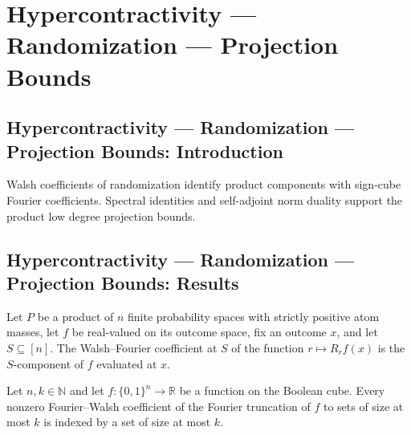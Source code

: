 \section{Hypercontractivity --- Randomization --- Projection Bounds}
\subsection*{Hypercontractivity --- Randomization --- Projection Bounds: Introduction}
Walsh coefficients of randomization identify product components with sign-cube Fourier coefficients. Spectral identities and self-adjoint norm duality support the product low degree projection bounds.

\subsection*{Hypercontractivity --- Randomization --- Projection Bounds: Results}

\begin{theorem}
\leanok
{}
Let $P$ be a product of $n$ finite probability spaces with strictly positive atom
masses, let $f$ be real-valued on its outcome space, fix an outcome $x$, and let
$S\subseteq[n]$. The Walsh--Fourier coefficient at $S$ of the function $r\mapsto
R_rf(x)$ is the $S$-component of $f$ evaluated at $x$.
\end{theorem}

\begin{theorem}
\leanok
{}
Let $n,k\in\mathbb N$ and let $f:\{0,1\}^n\to\mathbb R$ be a function on the Boolean
cube. Every nonzero Fourier–Walsh coefficient of the Fourier truncation of $f$ to sets
of size at most $k$ is indexed by a set of size at most $k$.
\end{theorem}

